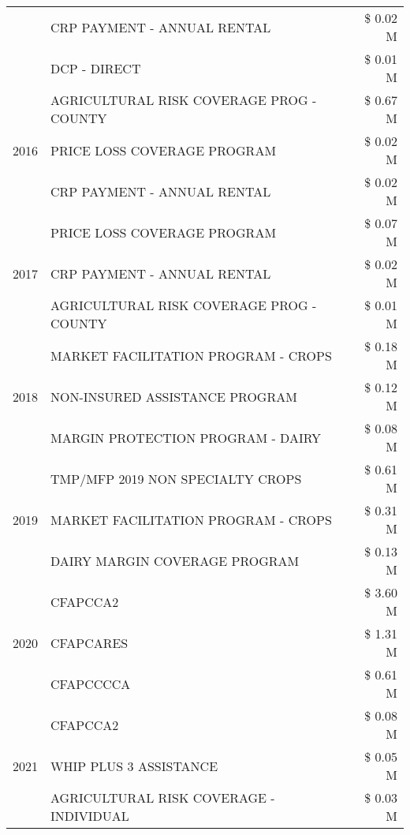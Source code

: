 \begin{tabular}{llr}
 & CRP PAYMENT - ANNUAL RENTAL & \$ 0.02 M \\
 & DCP - DIRECT & \$ 0.01 M \\
\cline{1-3}
\multirow[t]{3}{*}{2016} & AGRICULTURAL RISK COVERAGE PROG - COUNTY & \$ 0.67 M \\
 & PRICE LOSS COVERAGE PROGRAM & \$ 0.02 M \\
 & CRP PAYMENT - ANNUAL RENTAL & \$ 0.02 M \\
\cline{1-3}
\multirow[t]{3}{*}{2017} & PRICE LOSS COVERAGE PROGRAM & \$ 0.07 M \\
 & CRP PAYMENT - ANNUAL RENTAL & \$ 0.02 M \\
 & AGRICULTURAL RISK COVERAGE PROG - COUNTY & \$ 0.01 M \\
\cline{1-3}
\multirow[t]{3}{*}{2018} & MARKET FACILITATION PROGRAM - CROPS & \$ 0.18 M \\
 & NON-INSURED ASSISTANCE PROGRAM & \$ 0.12 M \\
 & MARGIN PROTECTION PROGRAM - DAIRY & \$ 0.08 M \\
\cline{1-3}
\multirow[t]{3}{*}{2019} & TMP/MFP 2019 NON SPECIALTY CROPS & \$ 0.61 M \\
 & MARKET FACILITATION PROGRAM - CROPS & \$ 0.31 M \\
 & DAIRY MARGIN COVERAGE PROGRAM & \$ 0.13 M \\
\cline{1-3}
\multirow[t]{3}{*}{2020} & CFAPCCA2 & \$ 3.60 M \\
 & CFAPCARES & \$ 1.31 M \\
 & CFAPCCCCA & \$ 0.61 M \\
\cline{1-3}
\multirow[t]{3}{*}{2021} & CFAPCCA2 & \$ 0.08 M \\
 & WHIP PLUS 3 ASSISTANCE & \$ 0.05 M \\
 & AGRICULTURAL RISK COVERAGE - INDIVIDUAL & \$ 0.03 M \\
\cline{1-3}
\bottomrule
\end{tabular}
